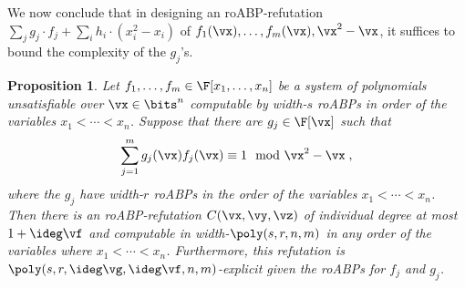 \documentclass[11pt]{article}
\numberwithin{equation}{section}
\newtheorem{proposition}[theorem]{Proposition}
\theoremstyle{definition}
\theoremstyle{plain}
\begin{document}
We now conclude that in designing an roABP-\lIPS refutation $\sum_j g_j\cdot f_j+\sum_i h_i\cdot (x_i^2-x_i)$ of $f_1(\vx),\ldots,f_m(\vx),\vx^2-\vx$, it suffices to bound the complexity of the $g_j$'s.

\begin{proposition}\label{res:multilin:roABP-lIPS}
        Let $f_1,\ldots,f_m\in\F[x_1,\ldots,x_n]$ be a system of polynomials unsatisfiable over $\vx\in\bits^n$ computable by width-$s$ roABPs in order of the variables $x_1<\cdots<x_n$.  Suppose that there are $g_j\in\F[\vx]$ such that
        \[
                \sum_{j=1}^m g_j(\vx)f_j(\vx)\equiv 1\mod\vx^2-\vx
                \;,
        \]
        where the $g_j$ have width-$r$ roABPs in the order of the variables $x_1<\cdots<x_n$.  Then there is an roABP-\lIPS refutation $C(\vx,\vy,\vz)$ of individual degree at most $1+\ideg \vf$ and computable in width-$\poly(s,r,n,m)$ in any order of the variables where $x_1<\cdots<x_n$.  Furthermore, this refutation is $\poly(s,r,\ideg \vg,\ideg \vf,n,m)$-explicit given the roABPs for $f_j$ and $g_j$.
\end{proposition}
\end{document}
